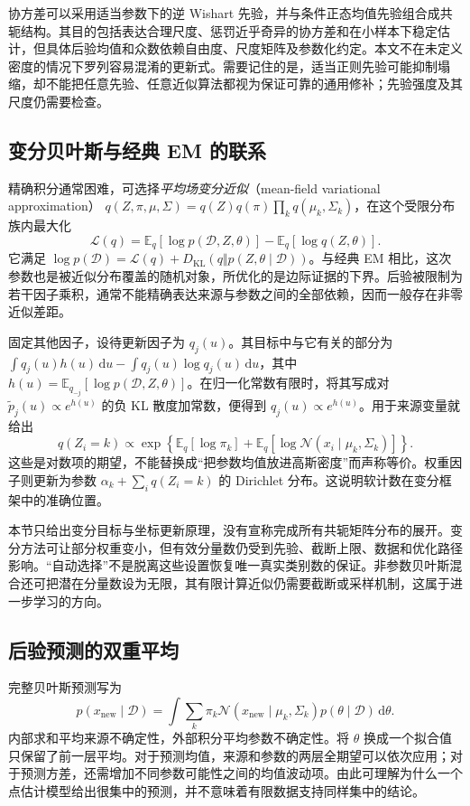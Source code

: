 \documentclass[UTF8,12pt,a4paper,fontset=fandol]{ctexart}
\begin{document}
协方差可以采用适当参数下的逆 Wishart 先验，并与条件正态均值先验组合成共轭结构。其目的包括表达合理尺度、惩罚近乎奇异的协方差和在小样本下稳定估计，但具体后验均值和众数依赖自由度、尺度矩阵及参数化约定。本文不在未定义密度的情况下罗列容易混淆的更新式。需要记住的是，适当正则先验可能抑制塌缩，却不能把任意先验、任意近似算法都视为保证可靠的通用修补；先验强度及其尺度仍需要检查。

\subsection{变分贝叶斯与经典 EM 的联系}
精确积分通常困难，可选择\emph{平均场变分近似}（mean-field variational approximation）
$q(Z,\pi,\mu,\Sigma)=q(Z)q(\pi)\prod_kq(\mu_k,\Sigma_k)$，在这个受限分布族内最大化
\begin{equation}
\mathcal L(q)=\mathbb E_q[\log p(\mathcal D,Z,\theta)]
-\mathbb E_q[\log q(Z,\theta)].
\label{eq:gmm-bayesian-elbo}
\end{equation}
它满足 $\log p(\mathcal D)=\mathcal L(q)+D_{\mathrm{KL}}(q\Vert p(Z,\theta\mid\mathcal D))$。与经典 EM 相比，这次参数也是被近似分布覆盖的随机对象，所优化的是边际证据的下界。后验被限制为若干因子乘积，通常不能精确表达来源与参数之间的全部依赖，因而一般存在非零近似差距。

固定其他因子，设待更新因子为 $q_j(u)$。其目标中与它有关的部分为 $\int q_j(u)h(u)\,\mathrm du-\int q_j(u)\log q_j(u)\,\mathrm du$，其中 $h(u)=\mathbb E_{q_{-j}}[\log p(\mathcal D,Z,\theta)]$。在归一化常数有限时，将其写成对 $\widetilde p_j(u)\propto e^{h(u)}$ 的负 KL 散度加常数，便得到 $q_j(u)\propto e^{h(u)}$。用于来源变量就给出
\begin{equation}
q(Z_i=k)\propto\exp\left\{\mathbb E_q[\log\pi_k]
+\mathbb E_q[\log\mathcal N(x_i\mid\mu_k,\Sigma_k)]\right\}.
\label{eq:gmm-vb-responsibility}
\end{equation}
这些是对数项的期望，不能替换成“把参数均值放进高斯密度”而声称等价。权重因子则更新为参数 $\alpha_k+\sum_iq(Z_i=k)$ 的 Dirichlet 分布。这说明软计数在变分框架中的准确位置。

本节只给出变分目标与坐标更新原理，没有宣称完成所有共轭矩阵分布的展开。变分方法可让部分权重变小，但有效分量数仍受到先验、截断上限、数据和优化路径影响。“自动选择”不是脱离这些设置恢复唯一真实类别数的保证。非参数贝叶斯混合还可把潜在分量数设为无限，其有限计算近似仍需要截断或采样机制，这属于进一步学习的方向。

\subsection{后验预测的双重平均}
完整贝叶斯预测写为
\[
p(x_{\mathrm{new}}\mid\mathcal D)=\int\sum_k\pi_k
\mathcal N(x_{\mathrm{new}}\mid\mu_k,\Sigma_k)
p(\theta\mid\mathcal D)\,\mathrm d\theta.
\]
内部求和平均来源不确定性，外部积分平均参数不确定性。将 $\theta$ 换成一个拟合值只保留了前一层平均。对于预测均值，来源和参数的两层全期望可以依次应用；对于预测方差，还需增加不同参数可能性之间的均值波动项。由此可理解为什么一个点估计模型给出很集中的预测，并不意味着有限数据支持同样集中的结论。
\end{document}
